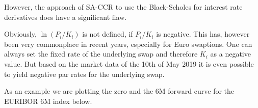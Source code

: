     

    
    However, the approach of SA-CCR to use the Black-Scholes for interest
rate derivatives does have a significant flaw.

Obviously, \(\ln\left(P_i / K_i \right)\) is not defined, if \(P_i/K_i\)
is negative. This has, however been very commonplace in recent years,
especially for Euro swaptions. One can always set the fixed rate of the
underlying swap and therefore \(K_i\) as a negative value. But based on
the market data of the 10th of May 2019 it is even possible to yield
negative par rates for the underlying swap.

As an example we are plotting the zero and the 6M forward curve for the
EURIBOR 6M index below.


